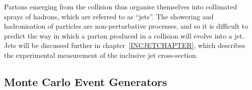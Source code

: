 Partons emerging from the collision thus organise themselves into collimated sprays of hadrons, which are referred to as ``jets''. The showering and hadronisation of particles are non-perturbative processes, and so it is difficult to predict the way in which a parton produced in a collision will evolve into a jet. Jets will be discussed further in chapter~\ref{INCJETCHAPTER}, which describes the experimental measurement of the inclusive jet cross-section. 

%
%
%
%
%
%
%
%
%
%
%
%
%















\subsection{Monte Carlo Event Generators}

